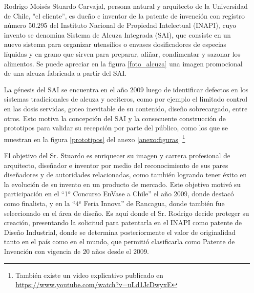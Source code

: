 Rodrigo Moisés Stuardo Carvajal, persona natural y arquitecto de la Universidad de Chile, "el cliente'', es dueño e inventor de la patente de invención con registro número 50.295 del Instituto Nacional de Propiedad Intelectual (INAPI), cuyo invento se denomina Sistema de Alcuza Integrada (SAI), que consiste en un nuevo sistema para organizar utensilios o envases dosificadores de especias líquidas y en grano que sirven para preparar, aliñar, condimentar y sazonar los alimentos. Se puede apreciar en la figura \ref{foto_alcuza} una imagen promocional de una alcuza fabricada a partir del SAI.

La génesis del SAI se encuentra en el año 2009 luego de identificar defectos en los sistemas tradicionales de alcuza y aceiteros, como por ejemplo el limitado control en las dosis servidas, goteo inevitable de su contenido, diseño sobrecargado, entre otros. Esto motiva la concepción del SAI y la consecuente construcción de prototipos para validar su recepción por parte del público, como los que se muestran en la figura \ref{prototipos} del anexo \ref{anexo:figuras} \footnote{También existe un video explicativo publicado en \url{https://www.youtube.com/watch?v=uLd1JcDwyxE}}

El objetivo del Sr. Stuardo es enriquecer su imagen y carrera profesional de arquitecto, diseñador e inventor por medio del reconocimiento de sus pares diseñadores y de autoridades relacionadas, como también logrando tener éxito en la evolución de su invento en un producto de mercado. Este objetivo motivó su participación en el  “1$^{o}$  Concurso EnVase a Chile” el año 2009, donde destacó como finalista, y en la “4$^{o}$ Feria Innova” de Rancagua, donde también fue seleccionado en el área de diseño. Es aquí donde el Sr. Rodrigo decide proteger su creación, presentando la solicitud para patentarla en el INAPI como patente de Diseño Industrial, donde se determina posteriormente el valor de originalidad tanto en el país como en el mundo, que permitió clasificarla como Patente de Invención con vigencia de 20 años desde el 2009.

